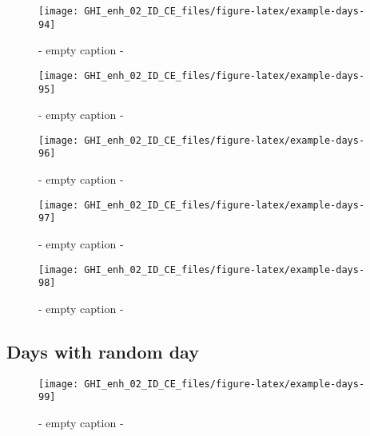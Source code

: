 \documentclass[
  10pt,
  a4paper,oneside]{article}
\begin{document}
\begin{figure}[H]

{\centering \texttt{[image: GHI\_enh\_02\_ID\_CE\_files/figure-latex/example-days-94]} 

}

\caption{ - empty caption - }\label{fig:example-days-94}
\end{figure}

\begin{figure}[H]

{\centering \texttt{[image: GHI\_enh\_02\_ID\_CE\_files/figure-latex/example-days-95]} 

}

\caption{ - empty caption - }\label{fig:example-days-95}
\end{figure}

\begin{figure}[H]

{\centering \texttt{[image: GHI\_enh\_02\_ID\_CE\_files/figure-latex/example-days-96]} 

}

\caption{ - empty caption - }\label{fig:example-days-96}
\end{figure}

\begin{figure}[H]

{\centering \texttt{[image: GHI\_enh\_02\_ID\_CE\_files/figure-latex/example-days-97]} 

}

\caption{ - empty caption - }\label{fig:example-days-97}
\end{figure}

\begin{figure}[H]

{\centering \texttt{[image: GHI\_enh\_02\_ID\_CE\_files/figure-latex/example-days-98]} 

}

\caption{ - empty caption - }\label{fig:example-days-98}
\end{figure}

\FloatBarrier

\hypertarget{days-with-random-day}{%
\subsection{Days with random day}\label{days-with-random-day}}

\begin{figure}[H]

{\centering \texttt{[image: GHI\_enh\_02\_ID\_CE\_files/figure-latex/example-days-99]} 

}

\caption{ - empty caption - }\label{fig:example-days-99}
\end{figure}
\end{document}
